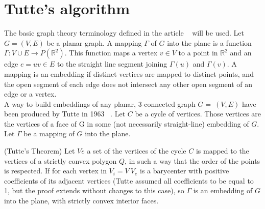 \section{Tutte's algorithm}

The basic graph theory terminology defined in the article ~\cite{pa, pb}
will be used.  Let $G=(V,E)$ be a planar graph. A mapping $\Gamma$ of $G$
into the plane is a function $\Gamma : V \cup E \to P(\mathbb{R}^2)$. This
function maps a vertex $v \in V$ to a point in $\mathbb{R}^2$ and an edge
$e = uv \in E$ to the straight line segment joining $\Gamma(u)$ and
$\Gamma(v)$.  A mapping is an embedding if distinct vertices are mapped to
distinct points, and the open segment of each edge does not intersect any
other open segment of an edge or a vertex.
\\

A way to build embeddings of any planar, 3-connected graph $G=~(V,E)$ have
been produced by Tutte in 1963 ~\cite{pc}. Let $C$ be a cycle of
vertices. Those vertices are the vertices of a face of G in some (not
necessarily straight-line) embedding of $G$. Let $\Gamma$ be a mapping of
$G$ into the plane.






\begin{theo} \label{theo:box} (Tutte’s Theorem) Let $Ve$ a set of the
  vertices of the cycle $C$ is mapped to the vertices of a strictly convex
  polygon $Q$, in such a way that the order of the points is respected.  If
  for each vertex in $V_i = V \ V_e$ is a barycenter with positive
  coefficients of its adjacent vertices (Tutte assumed all coefficients to
  be equal to 1, but the proof extends without changes to this case), so
  $\Gamma$ is an embedding of $G$ into the plane, with strictly convex
  interior faces.
\end{theo}

